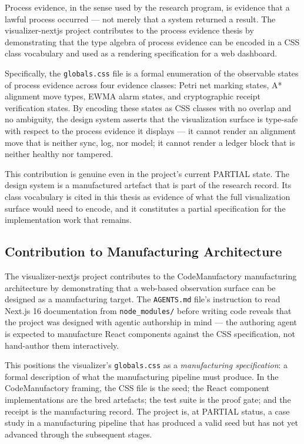 Process evidence, in the sense used by the research program, is evidence that a lawful
process occurred --- not merely that a system returned a result. The visualizer-nextjs
project contributes to the process evidence thesis by demonstrating that the type algebra
of process evidence can be encoded in a CSS class vocabulary and used as a rendering
specification for a web dashboard.

Specifically, the \texttt{globals.css} file is a formal enumeration of the observable
states of process evidence across four evidence classes: Petri net marking states, A{*}
alignment move types, EWMA alarm states, and cryptographic receipt verification states.
By encoding these states as CSS classes with no overlap and no ambiguity, the design
system asserts that the visualization surface is type-safe with respect to the process
evidence it displays --- it cannot render an alignment move that is neither sync, log,
nor model; it cannot render a ledger block that is neither healthy nor tampered.

This contribution is genuine even in the project's current PARTIAL state. The design
system is a manufactured artefact that is part of the research record. Its class vocabulary
is cited in this thesis as evidence of what the full visualization surface would need
to encode, and it constitutes a partial specification for the implementation work that
remains.

\subsection{Contribution to Manufacturing Architecture}
\label{sec:experiments-visualizer-nextjs-contribution-manufacturing}

The visualizer-nextjs project contributes to the CodeManufactory manufacturing architecture
by demonstrating that a web-based observation surface can be designed as a manufacturing
target. The \texttt{AGENTS.md} file's instruction to read Next.js 16 documentation from
\texttt{node\_modules/} before writing code reveals that the project was designed with
agentic authorship in mind --- the authoring agent is expected to manufacture React
components against the CSS specification, not hand-author them interactively.

This positions the visualizer's \texttt{globals.css} as a \emph{manufacturing specification}:
a formal description of what the manufacturing pipeline must produce. In the CodeManufactory
framing, the CSS file is the seed; the React component implementations are the bred artefacts;
the test suite is the proof gate; and the receipt is the manufacturing record. The project
is, at PARTIAL status, a case study in a manufacturing pipeline that has produced a valid
seed but has not yet advanced through the subsequent stages.

